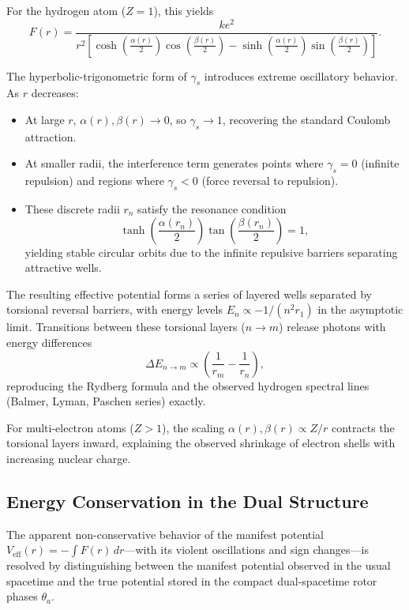 \documentclass[dvipdfmx,a4paper]{article}
\begin{document}
For the hydrogen atom (\(Z=1\)), this yields
\[
F(r) = \frac{k e^2}{r^2 \left[ \cosh\!\left(\frac{\alpha(r)}{2}\right) \cos\!\left(\frac{\beta(r)}{2}\right) - \sinh\!\left(\frac{\alpha(r)}{2}\right) \sin\!\left(\frac{\beta(r)}{2}\right) \right]}.
\]

The hyperbolic-trigonometric form of \(\gamma_s\) introduces extreme oscillatory behavior. As \(r\) decreases:

\begin{itemize}
  \item At large \(r\), \(\alpha(r),\beta(r) \to 0\), so \(\gamma_s \to 1\), recovering the standard Coulomb attraction.
  \item At smaller radii, the interference term generates points where \(\gamma_s = 0\) (infinite repulsion) and regions where \(\gamma_s < 0\) (force reversal to repulsion).
  \item These discrete radii \(r_n\) satisfy the resonance condition
  \[
  \tanh\!\left(\frac{\alpha(r_n)}{2}\right) \tan\!\left(\frac{\beta(r_n)}{2}\right) = 1,
  \]
  yielding stable circular orbits due to the infinite repulsive barriers separating attractive wells.
\end{itemize}

The resulting effective potential forms a series of layered wells separated by torsional reversal barriers, with energy levels \(E_n \propto -1/(n^2 r_1)\) in the asymptotic limit. Transitions between these torsional layers (\(n \to m\)) release photons with energy differences
\[
\Delta E_{n \to m} \propto \left( \frac{1}{r_m} - \frac{1}{r_n} \right),
\]
reproducing the Rydberg formula and the observed hydrogen spectral lines (Balmer, Lyman, Paschen series) exactly.

For multi-electron atoms (\(Z > 1\)), the scaling \(\alpha(r),\beta(r) \propto Z/r\) contracts the torsional layers inward, explaining the observed shrinkage of electron shells with increasing nuclear charge.

\subsection{Energy Conservation in the Dual Structure}

The apparent non-conservative behavior of the manifest potential \(V_\text{eff}(r) = -\int F(r)\, dr\)—with its violent oscillations and sign changes—is resolved by distinguishing between the manifest potential observed in the usual spacetime and the true potential stored in the compact dual-spacetime rotor phases \(\theta_a\).
\end{document}
